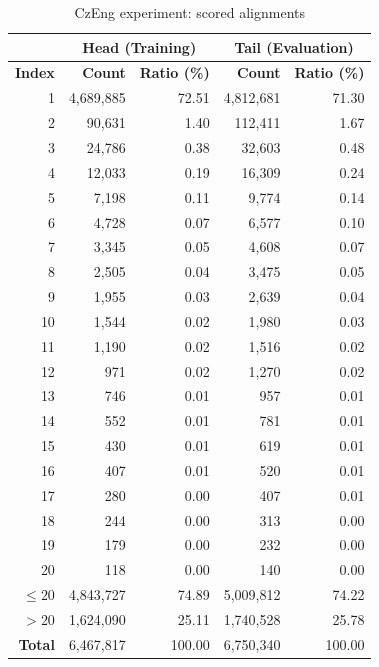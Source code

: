 \begin{table}[!htb]
	\centering
	\caption{CzEng experiment: scored alignments}
	\label{table:czeng_score}
	\vspace{1em}
	\begin{tabular}{|r||r|r||r|r|}
		\hline
		& \multicolumn{2}{c||}{\textbf{Head (Training)}} & \multicolumn{2}{c|}{\textbf{Tail (Evaluation)}} \\
		\hline
		\textbf{Index} & \textbf{Count} & \textbf{Ratio (\%)} & \textbf{Count} & \textbf{Ratio (\%)} \\ \hline
		1 & 4,689,885 & 72.51 & 4,812,681 & 71.30 \\
		2 & 90,631 & 1.40 & 112,411 & 1.67 \\
		3 & 24,786 & 0.38 & 32,603 & 0.48 \\
		4 & 12,033 & 0.19 & 16,309 & 0.24 \\
		5 & 7,198 & 0.11 & 9,774 & 0.14 \\
		6 & 4,728 & 0.07 & 6,577 & 0.10 \\
		7 & 3,345 & 0.05 & 4,608 & 0.07 \\
		8 & 2,505 & 0.04 & 3,475 & 0.05 \\
		9 & 1,955 & 0.03 & 2,639 & 0.04 \\
		10 & 1,544 & 0.02 & 1,980 & 0.03 \\
		11 & 1,190 & 0.02 & 1,516 & 0.02 \\
		12 & 971 & 0.02 & 1,270 & 0.02 \\
		13 & 746 & 0.01 & 957 & 0.01 \\
		14 & 552 & 0.01 & 781 & 0.01 \\
		15 & 430 & 0.01 & 619 & 0.01 \\
		16 & 407 & 0.01 & 520 & 0.01 \\
		17 & 280 & 0.00 & 407 & 0.01 \\
		18 & 244 & 0.00 & 313 & 0.00 \\
		19 & 179 & 0.00 & 232 & 0.00 \\
		20 & 118 & 0.00 & 140 & 0.00 \\
		\hline
		$\leq 20$ & 4,843,727 & 74.89 & 5,009,812 & 74.22 \\
		$> 20$ & 1,624,090 & 25.11 & 1,740,528 & 25.78 \\
		\hline
		\textbf{Total} & 6,467,817 & 100.00 & 6,750,340 & 100.00 \\
		\hline
	\end{tabular}
\end{table}


